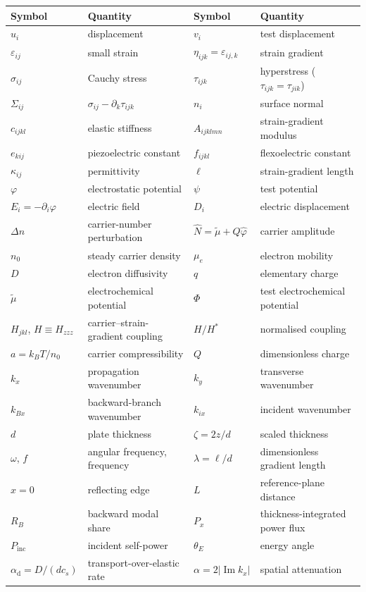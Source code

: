 \documentclass[10pt,a4paper]{article}
\DeclareMathOperator{\Imag}{Im}
\begin{document}
\begin{center}
\small
\begin{tabular}{@{}ll@{\qquad}ll@{}}
\toprule
Symbol & Quantity & Symbol & Quantity \\
\midrule
$u_i$ & displacement & $v_i$ & test displacement \\
$\varepsilon_{ij}$ & small strain & $\eta_{ijk}=\varepsilon_{ij,k}$ & strain gradient \\
$\sigma_{ij}$ & Cauchy stress & $\tau_{ijk}$ & hyperstress ($\tau_{ijk}=\tau_{jik}$) \\
$\Sigma_{ij}$ & $\sigma_{ij}-\partial_k\tau_{ijk}$ & $n_i$ & surface normal \\
$c_{ijkl}$ & elastic stiffness & $A_{ijklmn}$ & strain-gradient modulus \\
$e_{kij}$ & piezoelectric constant & $f_{ijkl}$ & flexoelectric constant \\
$\kappa_{ij}$ & permittivity & $\ell$ & strain-gradient length \\
$\varphi$ & electrostatic potential & $\psi$ & test potential \\
$E_i=-\partial_i\varphi$ & electric field & $D_i$ & electric displacement \\
$\Delta n$ & carrier-number perturbation & $\widehat N=\widetilde\mu+Q\widehat\varphi$ & carrier amplitude \\
$n_0$ & steady carrier density & $\mu_e$ & electron mobility \\
$D$ & electron diffusivity & $q$ & elementary charge \\
$\widetilde\mu$ & electrochemical potential & $\Phi$ & test electrochemical potential \\
$H_{jkl}$, $H\equiv H_{zzz}$ & carrier--strain-gradient coupling & $H/H^{*}$ & normalised coupling \\
$a=k_BT/n_0$ & carrier compressibility & $Q$ & dimensionless charge \\
$k_x$ & propagation wavenumber & $k_y$ & transverse wavenumber \\
$k_{Bx}$ & backward-branch wavenumber & $k_{ix}$ & incident wavenumber \\
$d$ & plate thickness & $\zeta=2z/d$ & scaled thickness \\
$\omega$, $f$ & angular frequency, frequency & $\lambda=\ell/d$ & dimensionless gradient length \\
$x=0$ & reflecting edge & $L$ & reference-plane distance \\
$R_B$ & backward modal share & $P_x$ & thickness-integrated power flux \\
$P_{\text{inc}}$ & incident self-power & $\theta_E$ & energy angle \\
$\alpha_{\mathrm d}=D/(dc_s)$ & transport-over-elastic rate & $\alpha=2|\Imag k_x|$ & spatial attenuation \\
\bottomrule
\end{tabular}
\end{center}
\end{document}
